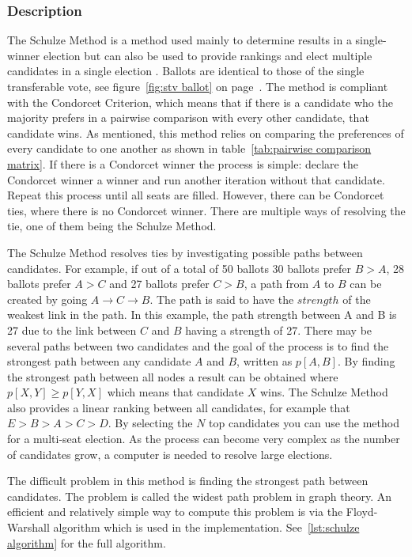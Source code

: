 \documentclass[12pt]{article}
\begin{document}
\subsubsection{Description}
The Schulze Method is a method used mainly to determine results in a single-winner election but can also be used to provide rankings and elect multiple candidates in a single election \autocite{Schulze2011}. Ballots are identical to those of the single transferable vote, see figure~\ref{fig:stv ballot} on page~\pageref{fig:stv ballot}. The method is compliant with the Condorcet Criterion, which means that if there is a candidate who the majority prefers in a pairwise comparison with every other candidate, that candidate wins. As mentioned, this method relies on comparing the preferences of every candidate to one another as shown in table~\ref{tab:pairwise comparison matrix}. If there is a Condorcet winner the process is simple: declare the Condorcet winner a winner and run another iteration without that candidate. Repeat this process until all seats are filled. However, there can be Condorcet ties, where there is no Condorcet winner. There are multiple ways of resolving the tie, one of them being the Schulze Method.

The Schulze Method resolves ties by investigating possible paths between candidates. For example, if out of a total of 50 ballots 30 ballots prefer $B>A$, 28 ballots prefer $A>C$ and 27 ballots prefer $C>B$, a path from $A$ to $B$ can be created by going $A \rightarrow C \rightarrow B$. The path is said to have the $strength$ of the weakest link in the path. In this example, the path strength between A and B is 27 due to the link between $C$ and $B$ having a strength of 27. There may be several paths between two candidates and the goal of the process is to find the strongest path between any candidate $A$ and $B$, written as $p[A,B]$. By finding the strongest path between all nodes a result can be obtained where $p[X,Y] \geq p[Y,X]$ which means that candidate $X$ wins. The Schulze Method also provides a linear ranking between all candidates, for example that $E > B > A > C > D$. By selecting the $N$ top candidates you can use the method for a multi-seat election. As the process can become very complex as the number of candidates grow, a computer is needed to resolve large elections.

The difficult problem in this method is finding the strongest path between candidates. The problem is called the widest path problem in graph theory. An efficient and relatively simple way to compute this problem is via the Floyd-Warshall algorithm which is used in the implementation. See~\ref{lst:schulze algorithm} for the full algorithm.
\end{document}
